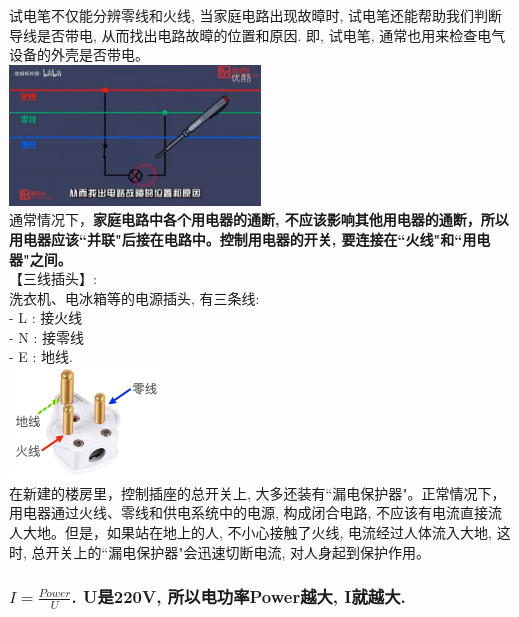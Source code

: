 \documentclass[UTF8]{ctexart}
\begin{document}
试电笔不仅能分辨零线和火线, 当家庭电路出现故暲时, 试电笔还能帮助我们判断导线是否带电, 从而找出电路故暲的位置和原因. 即, 试电笔, 通常也用来检查电气设备的外壳是否带电。 \\
\includegraphics[width=0.5\textwidth]{img/0072.png}  \\

通常情况下，\textbf{家庭电路中各个用电器的通断, 不应该影响其他用电器的通断，所以用电器应该``并联"后接在电路中。控制用电器的开关, 要连接在``火线"和``用电器"之间。} \\



【三线插头】: \\
洗衣机、电冰箱等的电源插头, 有三条线: \\
- L : 接火线 \\
- N : 接零线 \\
- E : 地线.  \\

	\includegraphics[width=0.3\textwidth]{img/0063.png}  \\

	
	在新建的楼房里，控制插座的总开关上, 大多还装有``漏电保护器"。正常情况下，用电器通过火线、零线和供电系统中的电源, 构成闭合电路, 不应该有电流直接流人大地。但是，如果站在地上的人, 不小心接触了火线, 电流经过人体流入大地, 这时, 总开关上的``漏电保护器"会迅速切断电流, 对人身起到保护作用。 \\
	
	
	\vspace{1em} 
	
	
	\subsubsection{$I=\frac{Power} {U}$. U是220V, 所以电功率Power越大, I就越大.}
	
\end{document}
